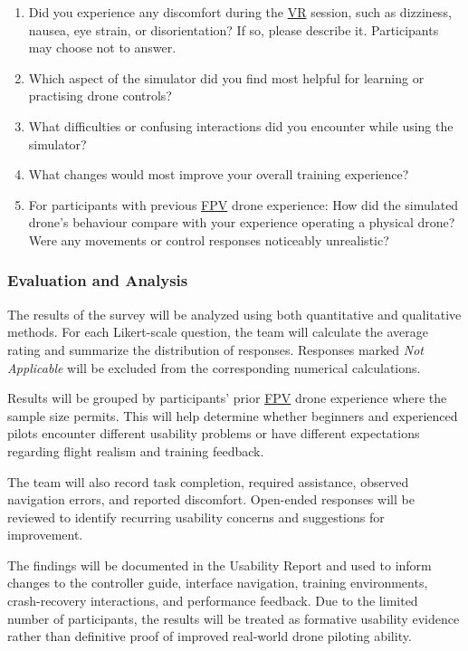 \documentclass[12pt, titlepage]{article}
\begin{document}
\begin{enumerate}
    \item[\textbf{Q18.}] Did you experience any discomfort during the \hyperlink{abbr:VR}{VR} session, such as dizziness, nausea, eye strain, or disorientation? If so, please describe it. Participants may choose not to answer.

    \item[\textbf{Q19.}] Which aspect of the simulator did you find most helpful for learning or practising drone controls?

    \item[\textbf{Q20.}] What difficulties or confusing interactions did you encounter while using the simulator?

    \item[\textbf{Q21.}] What changes would most improve your overall training experience?

    \item[\textbf{Q22.}] For participants with previous \hyperlink{abbr:FPV}{FPV} drone experience: How did the simulated drone's behaviour compare with your experience operating a physical drone? Were any movements or control responses noticeably unrealistic?
\end{enumerate}

\subsubsection{Evaluation and Analysis}

The results of the survey will be analyzed using both quantitative and qualitative methods. For each Likert-scale question, the team will calculate the average rating and summarize the distribution of responses. Responses marked \textit{Not Applicable} will be excluded from the corresponding numerical calculations.

Results will be grouped by participants' prior \hyperlink{abbr:FPV}{FPV} drone experience where the sample size permits. This will help determine whether beginners and experienced pilots encounter different usability problems or have different expectations regarding flight realism and training feedback.

The team will also record task completion, required assistance, observed navigation errors, and reported discomfort. Open-ended responses will be reviewed to identify recurring usability concerns and suggestions for improvement.

The findings will be documented in the Usability Report and used to inform changes to the controller guide, interface navigation, training environments, crash-recovery interactions, and performance feedback. Due to the limited number of participants, the results will be treated as formative usability evidence rather than definitive proof of improved real-world drone piloting ability.
\end{document}
